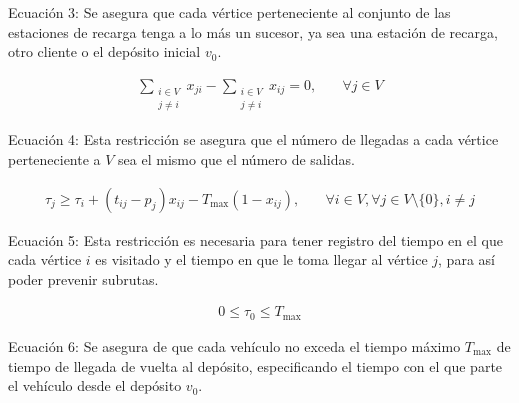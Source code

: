 \documentclass[letter, 10pt]{article}
\begin{document}
\begin{center}
    Ecuación 3: Se asegura que cada vértice perteneciente al conjunto de las estaciones de recarga tenga a lo más un sucesor, ya sea una estación de recarga, otro cliente o el depósito inicial $v_0$.
\end{center}

\begin{align}
    \sum_{\substack{i\in V\\ j \neq i}} x_{ji} - \sum_{\substack{i\in V\\ j \neq i}} x_{ij} = 0, & \quad \forall j \in V
\end{align}

\begin{center}
    Ecuación 4: Esta restricción se asegura que el número de llegadas a cada vértice perteneciente a $V$ sea el mismo que el número de salidas.
\end{center}




\begin{align}
    \tau_j \geq \tau_i + (t_{ij} - p_j)x_{ij} - T_{\text{max}}(1 - x_{ij}), & \quad \forall i \in V, \forall j \in V \text{\textbackslash}\{0\}, i \neq j
\end{align}

\begin{center}
    Ecuación 5: Esta restricción es necesaria para tener registro del tiempo en el que cada vértice $i$ es visitado y el tiempo en que le toma llegar al vértice $j$, para así poder prevenir subrutas.
\end{center}


\begin{align}
    0 \leq \tau_0 \leq T_{\text{max}}
\end{align}

\begin{center}
    Ecuación 6: Se asegura de que cada vehículo no exceda el tiempo máximo $T_{\text{max}}$ de tiempo de llegada de vuelta al depósito, especificando el tiempo con el que parte el vehículo desde el depósito $v_0$.
\end{center}
\end{document}
